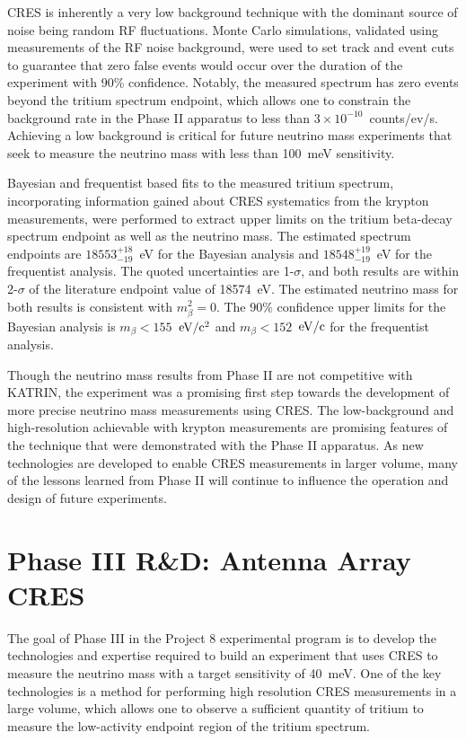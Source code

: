 CRES is inherently a very low background technique with the dominant source of noise being random RF fluctuations. Monte Carlo simulations, validated using measurements of the RF noise background, were used to set track and event cuts to guarantee that zero false events would occur over the duration of the experiment with 90\% confidence. Notably, the measured spectrum has zero events beyond the tritium spectrum endpoint, which allows one to constrain the background rate in the Phase II apparatus to less than $3\times10^{-10}$~counts/ev/s. Achieving a low background is critical for future neutrino mass experiments that seek to measure the neutrino mass with less than 100~meV sensitivity.

Bayesian and frequentist based fits to the measured tritium spectrum, incorporating information gained about CRES systematics from the krypton measurements, were performed to extract upper limits on the tritium beta-decay spectrum endpoint as well as the neutrino mass. The estimated spectrum endpoints are $18553^{+18}_{-19}$~eV for the Bayesian analysis and $18548^{+19}_{-19}$~eV for the frequentist analysis. The quoted uncertainties are 1-$\sigma$, and both results are within 2-$\sigma$ of the literature endpoint value of 18574~eV. The estimated neutrino mass for both results is consistent with $m_\beta^2=0$. The 90\% confidence upper limits for the Bayesian analysis is $m_\beta < 155$~$\rm{eV}/\rm{c}^2$ and $m_\beta < 152$~$\rm{eV}/\rm{c}$ for the frequentist analysis.

Though the neutrino mass results from Phase II are not competitive with KATRIN, the experiment was a promising first step towards the development of more precise neutrino mass measurements using CRES. The low-background and high-resolution achievable with krypton measurements are promising features of the technique that were demonstrated with the Phase II apparatus. As new technologies are developed to enable CRES measurements in larger volume, many of the lessons learned from Phase II will continue to influence the operation and design of future experiments.

\section{Phase III R\&D: Antenna Array CRES}
\label{sec:chap3-phaseIII-antenna-arrays}

The goal of Phase III in the Project 8 experimental program is to develop the technologies and expertise required to build an experiment that uses CRES to measure the neutrino mass with a target sensitivity of 40~meV. One of the key technologies is a method for performing high resolution CRES measurements in a large volume, which allows one to observe a sufficient quantity of tritium to measure the low-activity endpoint region of the tritium spectrum. 

